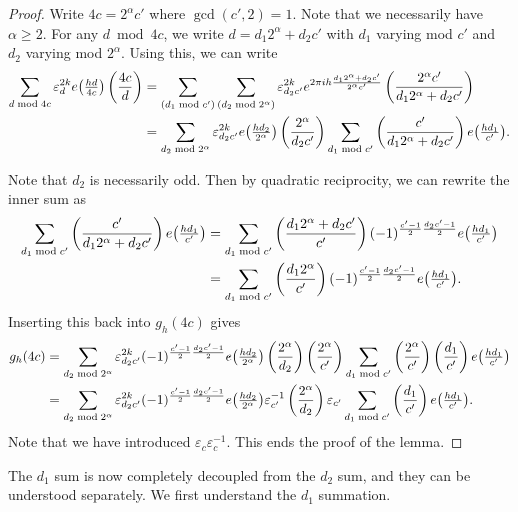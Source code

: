 \begin{proof}

Write $4c = 2^\alpha c'$ where $\gcd(c', 2) = 1$.
Note that we necessarily have $\alpha \geq 2$.
For any $d \bmod 4c$, we write $d = d_1 2^\alpha + d_2c'$ with $d_1$ varying mod $c'$ and
$d_2$ varying mod $2^\alpha$.
Using this, we can write
\begin{align}
    \sum_{d \bmod 4c} \varepsilon_d^{2k} e\big(\tfrac{hd}{4c}\big) \left(\frac{4c}{d}\right)
    &=
    \sum_{(d_1\bmod c')} \sum_{(d_2\bmod 2^\alpha)} \varepsilon_{d_2c'}^{2k}
    e^{2\pi i h \frac{d_1 2^\alpha + d_2 c'}{2^\alpha c'}}
    \left(\frac{2^\alpha c'}{d_1 2^\alpha + d_2c'}\right)
    \\
    &=
    \sum_{d_2 \bmod 2^\alpha} \varepsilon_{d_2c'}^{2k}
    e\big(\tfrac{h d_2}{2^\alpha}\big)
    \left(\frac{2^\alpha}{d_2c'}\right) \sum_{d_1 \bmod c'}
  \left(\frac{c'}{d_1 2^\alpha+ d_2c'}\right) e\big( \tfrac{h d_1}{c'} \big).
\end{align}

Note that $d_2$ is necessarily odd.
Then by quadratic reciprocity, we can rewrite the inner sum as
\begin{align}
    \sum_{d_1 \bmod c'} \left(\frac{c'}{d_1 2^\alpha+ d_2c'}\right) e\big( \tfrac{h d_1}{c'} \big)
    &=
    \sum_{d_1 \bmod c'} \left(\frac{d_1 2^\alpha + d_2 c'}{c'}\right)
    (-1)^{\frac{c'-1}{2} \frac{d_2c'-1}{2}} e \big( \tfrac{h d_1}{c'} \big)
    \\
    &=
    \sum_{d_1 \bmod c'} \left(\frac{d_1 2^\alpha}{c'}\right) (-1)^{\frac{c'-1}{2}
    \frac{d_2c'-1}{2}} e\big( \tfrac{h d_1}{c'}\big).
\end{align}
Inserting this back into $g_h(4c)$ gives
\begin{align}
  g_h(4c)
  &=
  \sum_{d_2\bmod 2^\alpha} \varepsilon_{d_2c'}^{2k} (-1)^{\frac{c'-1}{2}
  \frac{d_2c'-1}{2}} e\big( \tfrac{h d_2}{2^\alpha} \big) \left(\frac{2^\alpha}{d_2}\right)
  \left(\frac{2^\alpha}{c'}\right)\sum_{d_1\bmod c'} \left(\frac{2^\alpha}{c'}\right)\left(\frac{d_1}{c'}\right)
  e\big( \tfrac{h d_1}{c'} \big) \\
  &=
  \sum_{d_2\bmod 2^\alpha} \varepsilon_{d_2c'}^{2k} (-1)^{\frac{c'-1}{2}
  \frac{d_2c'-1}{2}} e\big( \tfrac{h d_2}{2^\alpha} \big)
  \varepsilon_{c'}^{-1} \left(\frac{2^\alpha}{d_2}\right)
  \varepsilon_{c'}\sum_{d_1\bmod c'} \left(\frac{d_1}{c'}\right)  e\big( \tfrac{h d_1}{c'} \big).
\end{align}
Note that we have introduced $\varepsilon_c \varepsilon_c^{-1}$.
This ends the proof of the lemma.
\end{proof}


The $d_1$ sum is now completely decoupled from the $d_2$ sum, and they can be understood
separately.
We first understand the $d_1$ summation.



